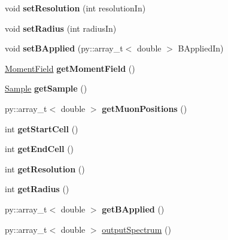 \begin{DoxyCompactItemize}
void {\bfseries set\+Resolution} (int resolution\+In)
\item 
\mbox{\label{class_spectrum_creator_ac09230548d536dcc17b131ca97d48f11}} 
void {\bfseries set\+Radius} (int radius\+In)
\item 
\mbox{\label{class_spectrum_creator_a4da4485ffb15a0d22cfe17b0e9c9c2e9}} 
void {\bfseries set\+B\+Applied} (py\+::array\+\_\+t$<$ double $>$ B\+Applied\+In)
\item 
\mbox{\label{class_spectrum_creator_a0d219ebef56f7ab432ceb5706a9669cb}} 
\mbox{\hyperlink{class_moment_field}{Moment\+Field}} {\bfseries get\+Moment\+Field} ()
\item 
\mbox{\label{class_spectrum_creator_a238e280cb3f1c51de6075dd1b70115fb}} 
\mbox{\hyperlink{class_sample}{Sample}} {\bfseries get\+Sample} ()
\item 
\mbox{\label{class_spectrum_creator_a73ddbac63c108000a4ebc009dc80e9b4}} 
py\+::array\+\_\+t$<$ double $>$ {\bfseries get\+Muon\+Positions} ()
\item 
\mbox{\label{class_spectrum_creator_a5f4caeb95b7e652367184d549f1c0ad2}} 
int {\bfseries get\+Start\+Cell} ()
\item 
\mbox{\label{class_spectrum_creator_a02c019506625338c5bdc5142c23e95c8}} 
int {\bfseries get\+End\+Cell} ()
\item 
\mbox{\label{class_spectrum_creator_aace4663a4065b854d730f0616b57fcba}} 
int {\bfseries get\+Resolution} ()
\item 
\mbox{\label{class_spectrum_creator_a1d5c3c8d02f76002539b5cd5178b6242}} 
int {\bfseries get\+Radius} ()
\item 
\mbox{\label{class_spectrum_creator_ac684eb71bc78e7a6ba09ddb5726e439b}} 
py\+::array\+\_\+t$<$ double $>$ {\bfseries get\+B\+Applied} ()
\item 
py\+::array\+\_\+t$<$ double $>$ \mbox{\hyperlink{class_spectrum_creator_a0ca83ad1943d3a66182d18d096298ce0}{output\+Spectrum}} ()
\end{DoxyCompactItemize}


